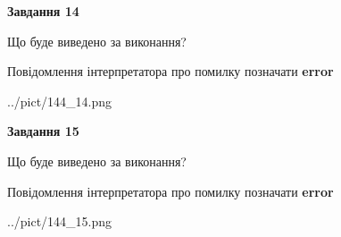 \documentclass[11pt, ukrainian]{article}
\begin{document}
{\begin {large}
{\begin {center}\textbf{Завдання 14}\end {center}}\par
Що буде виведено за виконання? \par
Повідомлення інтерпретатора про помилку позначати \textbf{error}

\begin{center}
	{../pict/144_14.png}
\end{center}
\newpage

{\begin {center}\textbf{Завдання 15}\end {center}}\par
Що буде виведено за виконання? \par
Повідомлення інтерпретатора про помилку позначати \textbf{error}

\begin{center}
	{../pict/144_15.png}
\end{center}
\newpage

\end {large}}
\end{document}
